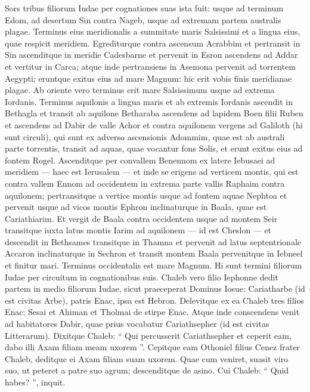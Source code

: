 \begin{biblechapter}
\begin{biblechapter}
\begin{biblechapter}
\begin{biblechapter}
\begin{biblechapter}
\begin{biblechapter}
\begin{biblechapter}
\begin{biblechapter}
\begin{biblechapter}
\begin{biblechapter}
\begin{biblechapter}
\begin{biblechapter}
\begin{biblechapter}
\begin{biblechapter}
\begin{biblechapter}
\verse Sors tribus filiorum Iudae per cognationes suas ista fuit: usque ad terminum Edom, ad desertum Sin contra Nageb, usque ad extremam partem australis plagae. 
\verse Terminus eius meridionalis a summitate maris Salsissimi et a lingua eius, quae respicit meridiem. 
\verse Egrediturque contra ascensum Acrabbim et pertransit in Sin ascenditque in meridie Cadesbarne et pervenit in Esron ascendens ad Addar et vertitur in Carca; 
\verse atque inde pertransiens in Asemona pervenit ad torrentem Aegypti; eruntque exitus eius ad mare Magnum: hic erit vobis finis meridianae plagae. 
\verse Ab oriente vero terminus erit mare Salsissimum usque ad extrema Iordanis. Terminus aquilonis a lingua maris et ab extremis Iordanis 
\verse ascendit in Bethagla et transit ab aquilone Betharaba ascendens ad lapidem Boen filii Ruben 
\verse et ascendens ad Dabir de valle Achor et contra aquilonem vergens ad Galiloth (hi sunt circuli), qui sunt ex adverso ascensionis Adommim, quae est ab australi parte torrentis, transit ad aquas, quae vocantur fons Solis, et erunt exitus eius ad fontem Rogel. 
\verse Ascenditque per convallem Benennom ex latere Iebusaei ad meridiem — haec est Ierusalem — et inde se erigens ad verticem montis, qui est contra vallem Ennom ad occidentem in extrema parte vallis Raphaim contra aquilonem; 
\verse pertransitque a vertice montis usque ad fontem aquae Nephtoa et pervenit usque ad vicos montis Ephron inclinaturque in Baala, quae est Cariathiarim. 
\verse Et vergit de Baala contra occidentem usque ad montem Seir transitque iuxta latus montis Iarim ad aquilonem — id est Cheslon — et descendit in Bethsames transitque in Thamna 
\verse et pervenit ad latus septentrionale Accaron inclinaturque in Sechron et transit montem Baala pervenitque in Iebneel et finitur mari. Terminus occidentalis est mare Magnum. 
\verse Hi sunt termini filiorum Iudae per circuitum in cognationibus suis.
 \verse Chaleb vero filio Iephonne dedit partem in medio filiorum Iudae, sicut praeceperat Dominus Iosue: Cariatharbe (id est civitas Arbe), patris Enac, ipsa est Hebron. 
\verse Delevitque ex ea Chaleb tres filios Enac: Sesai et Ahiman et Tholmai de stirpe Enac. 
\verse Atque inde conscendens venit ad habitatores Dabir, quae prius vocabatur Cariathsepher (id est civitas Litterarum). 
\verse Dixitque Chaleb: “ Qui percusserit Cariathsepher et ceperit eam, dabo illi Axam filiam meam uxorem ”. 
\verse Cepitque eam Othoniel filius Cenez frater Chaleb, deditque ei Axam filiam suam uxorem. 
\verse Quae cum veniret, suasit viro suo, ut peteret a patre suo agrum; descenditque de asino. Cui Chaleb: “ Quid habes? ”, inquit. 

\end{biblechapter}
\end{biblechapter}
\end{biblechapter}
\end{biblechapter}
\end{biblechapter}
\end{biblechapter}
\end{biblechapter}
\end{biblechapter}
\end{biblechapter}
\end{biblechapter}
\end{biblechapter}
\end{biblechapter}
\end{biblechapter}
\end{biblechapter}
\end{biblechapter}

